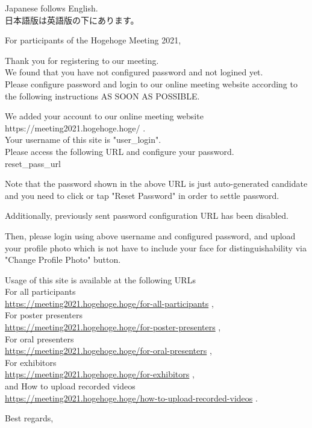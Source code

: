 \documentclass[titlepage,10pt,a4paper,uplatex]{jsbook}
\newenvironment{content}{\begin{shaded}\vspace{-1em}\raggedright\ttfamily\footnotesize\setlength{\baselineskip}{1.4em}}{\end{shaded}\vspace{-1em}}
\begin{document}
\begin{content}
Japanese follows English.\\
日本語版は英語版の下にあります。

For participants of the Hogehoge Meeting 2021,

Thank you for registering to our meeting.\\
We found that you have not configured password and not logined yet.\\
Please configure password and login to our online meeting website according to the following instructions AS SOON AS POSSIBLE.

We added your account to our online meeting website https://meeting2021.hogehoge.hoge/ .\\
Your username of this site is "{\lbrack}user\_login{\rbrack}".\\
Please access the following URL and configure your password.\\
{\lbrack}reset\_pass\_url{\rbrack}

Note that the password shown in the above URL is just auto-generated candidate and you need to click or tap "Reset Password" in order to settle password.

Additionally, previously sent password configuration URL has been disabled.

Then, please login using above username and configured password, and upload your profile photo which is not have to include your face for distinguishability via "Change Profile Photo" button.

Usage of this site is available at the following URLs\\
For all participants\\
\url{https://meeting2021.hogehoge.hoge/for-all-participants} ,\\
For poster presenters\\
\url{https://meeting2021.hogehoge.hoge/for-poster-presenters} ,\\
For oral presenters\\
\url{https://meeting2021.hogehoge.hoge/for-oral-presenters} ,\\
For exhibitors\\
\url{https://meeting2021.hogehoge.hoge/for-exhibitors} ,\\
and How to upload recorded videos\\
\url{https://meeting2021.hogehoge.hoge/how-to-upload-recorded-videos} .

Best regards,


\end{content}
\end{document}
